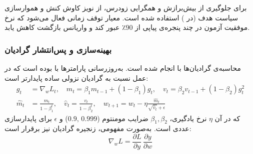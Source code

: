 برای جلوگیری از بیش‌برازش و همگرایی زودرس، از نویز کاوش کنش و هموارسازی سیاست هدف (در ) استفاده شده است. معیار توقف زمانی فعال می‌شود که نرخ موفقیت آزمون در چند پنجره‌ی پیاپی از 90٪ عبور کند و واریانس بازگشت کاهش یابد.

\subsubsection*{بهینه‌سازی و پس‌انتشار گرادیان}
محاسبه‌ی گرادیان‌ها با  انجام شده است. به‌روزرسانی پارامترها با   
\cite{kingma2017adammethodstochasticoptimization}
بوده است که در عمل نسبت به گرادیان نزولی ساده پایدارتر است:
\begin{align}
  g_t &= \nabla_{\!w} L_t,\quad
  m_t = \beta_1 m_{t-1} + (1-\beta_1) g_t,\quad
  v_t = \beta_2 v_{t-1} + (1-\beta_2) g_t^2 \nonumber\\
  \hat{m}_t &= \frac{m_t}{1-\beta_1^t},\quad
  \hat{v}_t = \frac{v_t}{1-\beta_2^t},\quad
  w_{t+1} = w_t - \eta \frac{\hat{m}_t}{\sqrt{\hat{v}_t} + \epsilon}
\end{align}
که در آن \(\eta\) نرخ یادگیری، \(\beta_1,\beta_2\) ضرایب مومنتوم (\(0.9,\,0.999\)) و \(\epsilon\) برای پایدارسازی عددی است. به‌صورت مفهومی، زنجیره گرادیان نیز برقرار است:
\begin{equation}
  \nabla_{\!w} L = \frac{\partial L}{\partial y}\,\frac{\partial y}{\partial w}
\end{equation}







